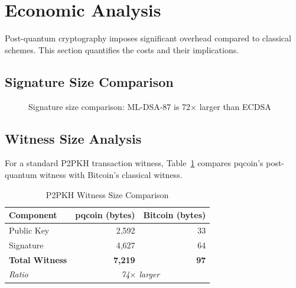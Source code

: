 \documentclass[11pt,a4paper]{article}
\begin{document}
\section{Economic Analysis}

Post-quantum cryptography imposes significant overhead compared to classical schemes. This section quantifies the costs and their implications.

\subsection{Signature Size Comparison}

\begin{figure}[h]
\centering
{}
\caption{Signature size comparison: ML-DSA-87 is 72$\times$ larger than ECDSA}
\label{fig:sig-comparison}
\end{figure}

\subsection{Witness Size Analysis}

For a standard P2PKH transaction witness, Table~\ref{tab:witness-size} compares pqcoin's post-quantum witness with Bitcoin's classical witness.

\begin{table}[ht]
\centering
\caption{P2PKH Witness Size Comparison}
\label{tab:witness-size}
\begin{tabular}{@{}lrr@{}}
\toprule
Component & pqcoin (bytes) & Bitcoin (bytes) \\
\midrule
Public Key & 2,592 & 33 \\
Signature & 4,627 & 64 \\
\textbf{Total Witness} & \textbf{7,219} & \textbf{97} \\
\midrule
\textit{Ratio} & \multicolumn{2}{c}{\textit{74$\times$ larger}} \\
\bottomrule
\end{tabular}
\end{table}
\end{document}
